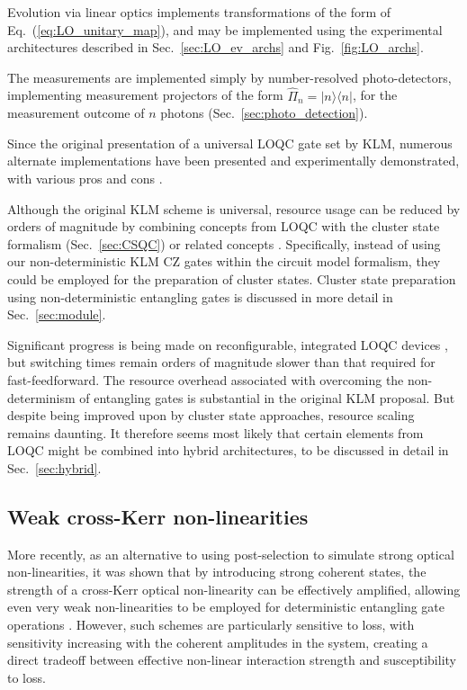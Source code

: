 \documentclass[aps,rmp,twocolumn,amsmath,amssymb,nofootinbib,superscriptaddress,longbibliography,floatfix,table-of-contents,eqsecnum]{revtex4-1}
\newcommand{\bra}[1]{\langle#1|}
\newcommand{\ket}[1]{|#1\rangle}
\begin{document}
Evolution via linear optics implements transformations of the form of Eq.~(\ref{eq:LO_unitary_map}), and may be implemented using the experimental architectures described in Sec.~\ref{sec:LO_ev_archs} and Fig.~\ref{fig:LO_archs}.

The measurements are implemented simply by number-resolved photo-detectors, implementing measurement projectors of the form \mbox{$\hat\Pi_n=\ket{n}\bra{n}$}, for the measurement outcome of $n$ photons (Sec.~\ref{sec:photo_detection}).

Since the original presentation of a universal LOQC gate set by KLM, numerous alternate implementations have been presented and experimentally demonstrated, with various pros and cons \cite{bib:Ralph01, bib:Pittman01, bib:Ralph02, bib:Knill02, bib:Pittman03, bib:MorYoran06}.

Although the original KLM scheme is universal, resource usage can be reduced by orders of magnitude by combining concepts from LOQC with the cluster state formalism (Sec.~\ref{sec:CSQC}) or related concepts \cite{bib:YoranReznik03, bib:Nielsen04, bib:BrowneRudolph05, bib:GilchristHayes05, bib:Lim05, bib:LimBarrett05}. Specifically, instead of using our non-deterministic KLM CZ gates within the circuit model formalism, they could be employed for the preparation of cluster states. Cluster state preparation using non-deterministic entangling gates is discussed in more detail in Sec.~\ref{sec:module}.

Significant progress is being made on reconfigurable, integrated LOQC devices \cite{bib:UniversalLOOBrien}, but switching times remain orders of magnitude slower than that required for fast-feedforward. The resource overhead associated with overcoming the non-determinism of entangling gates is substantial in the original KLM proposal. But despite being improved upon by cluster state approaches, resource scaling remains daunting. It therefore seems most likely that certain elements from LOQC might be combined into hybrid architectures, to be discussed in detail in Sec.~\ref{sec:hybrid}.

%
%

\subsection{Weak cross-Kerr non-linearities} 

More recently, as an alternative to using post-selection to simulate strong optical non-linearities, it was shown that by introducing strong coherent states, the strength of a cross-Kerr optical non-linearity can be effectively amplified, allowing even very weak non-linearities to be employed for deterministic entangling gate operations \cite{bib:Munro05}. However, such schemes are particularly sensitive to loss, with sensitivity increasing with the coherent amplitudes in the system, creating a direct tradeoff between effective non-linear interaction strength and susceptibility to loss.
\end{document}
